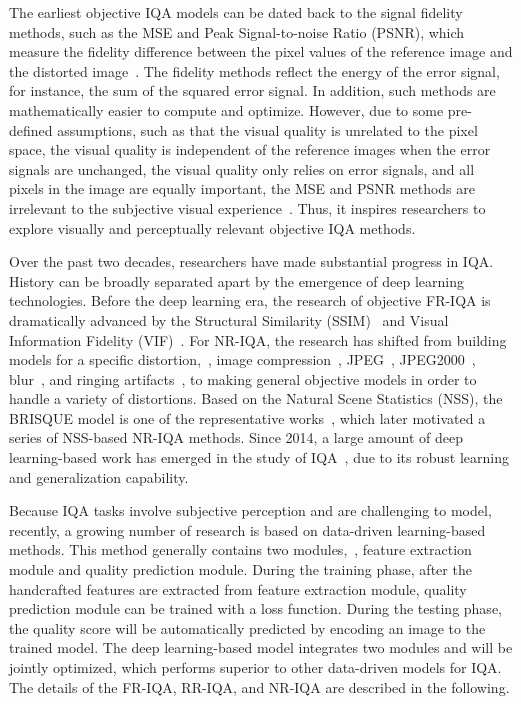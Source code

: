 	The earliest objective IQA models can be dated back to the signal fidelity methods, such as the MSE and Peak Signal-to-noise Ratio (PSNR), which measure the fidelity difference between the pixel values of the reference image and the distorted image~\citep{wang2006modern}. The fidelity methods reflect the energy of the error signal, for instance, the sum of the squared error signal. In addition, such methods are mathematically easier to compute and optimize. However, due to some pre-defined assumptions, such as that the visual quality is unrelated to the pixel space, the visual quality is independent of the reference images when the error signals are unchanged, the visual quality only relies on error signals, and all pixels in the image are equally important, the MSE and PSNR methods are irrelevant to the subjective visual experience~\citep{wang2004image}. Thus, it inspires researchers to explore visually and perceptually relevant objective IQA methods.
	
	Over the past two decades, researchers have made substantial progress in IQA. History can be broadly separated apart by the emergence of deep learning technologies. Before the deep learning era, the research of objective FR-IQA is dramatically advanced by the Structural Similarity (SSIM)~\citep{wang2004image} and Visual Information Fidelity (VIF)~\citep{sheikh2006image}. For NR-IQA, the research has shifted from building models for a specific distortion,~\eg, image compression~\citep{zhu2014no, liu2018end}, JPEG~\citep{wang2002no}, JPEG2000~\citep{sheikh2005no}, blur~\citep{wang2003local}, and ringing artifacts~\citep{liu2009no}, to making general objective models in order to handle a variety of distortions. Based on the Natural Scene Statistics (NSS), the BRISQUE model is one of the representative works~\citep{mittal2012no}, which later motivated a series of NSS-based NR-IQA methods. Since 2014, a large amount of deep learning-based work has emerged in the study of IQA~\citep{yang2019comparative}, due to its robust learning and generalization capability.
	
	Because IQA tasks involve subjective perception and are challenging to model, recently, a growing number of research is based on data-driven learning-based methods. This method generally contains two modules,~\ie, feature extraction module and quality prediction module. During the training phase, after the handcrafted features are extracted from feature extraction module, quality prediction module can be trained with a loss function. During the testing phase, the quality score will be automatically predicted by encoding an image to the trained model. The deep learning-based model integrates two modules and will be jointly optimized, which performs superior to other data-driven models for IQA. The details of the FR-IQA, RR-IQA, and NR-IQA are described in the following.
	

